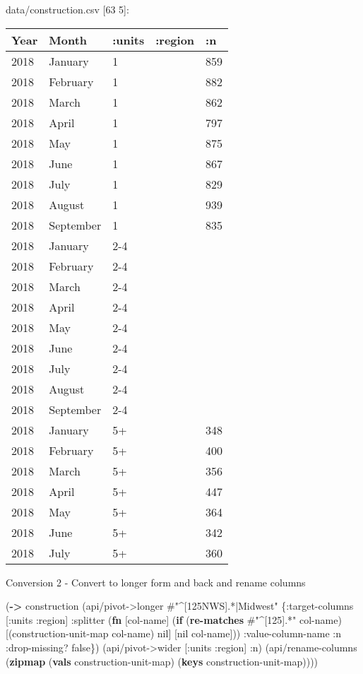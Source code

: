\documentclass[]{article}
\newenvironment{Shaded}{\begin{snugshade}}{\end{snugshade}}
\newcommand{\KeywordTok}[1]{\textcolor[rgb]{0.13,0.29,0.53}{\textbf{#1}}}
\newcommand{\SpecialStringTok}[1]{\textcolor[rgb]{0.31,0.60,0.02}{#1}}
\newcommand{\VariableTok}[1]{\textcolor[rgb]{0.00,0.00,0.00}{#1}}
\newcommand{\AttributeTok}[1]{\textcolor[rgb]{0.77,0.63,0.00}{#1}}
\newcommand{\NormalTok}[1]{#1}
\begin{document}
data/construction.csv {[}63 5{]}:

\begin{longtable}[]{@{}lllll@{}}
\toprule
Year & Month & :units & :region & :n\tabularnewline
\midrule
\endhead
2018 & January & 1 & & 859\tabularnewline
2018 & February & 1 & & 882\tabularnewline
2018 & March & 1 & & 862\tabularnewline
2018 & April & 1 & & 797\tabularnewline
2018 & May & 1 & & 875\tabularnewline
2018 & June & 1 & & 867\tabularnewline
2018 & July & 1 & & 829\tabularnewline
2018 & August & 1 & & 939\tabularnewline
2018 & September & 1 & & 835\tabularnewline
2018 & January & 2-4 & &\tabularnewline
2018 & February & 2-4 & &\tabularnewline
2018 & March & 2-4 & &\tabularnewline
2018 & April & 2-4 & &\tabularnewline
2018 & May & 2-4 & &\tabularnewline
2018 & June & 2-4 & &\tabularnewline
2018 & July & 2-4 & &\tabularnewline
2018 & August & 2-4 & &\tabularnewline
2018 & September & 2-4 & &\tabularnewline
2018 & January & 5+ & & 348\tabularnewline
2018 & February & 5+ & & 400\tabularnewline
2018 & March & 5+ & & 356\tabularnewline
2018 & April & 5+ & & 447\tabularnewline
2018 & May & 5+ & & 364\tabularnewline
2018 & June & 5+ & & 342\tabularnewline
2018 & July & 5+ & & 360\tabularnewline
\bottomrule
\end{longtable}

Conversion 2 - Convert to longer form and back and rename columns

\begin{Shaded}
\begin{Highlighting}[]
\NormalTok{(}\KeywordTok{->}\NormalTok{ construction}
\NormalTok{    (api/pivot->longer }\SpecialStringTok{#"^[125NWS].*|Midwest"}\NormalTok{ \{}\AttributeTok{:target-columns}\NormalTok{ [}\AttributeTok{:units} \AttributeTok{:region}\NormalTok{]}
                                               \AttributeTok{:splitter}\NormalTok{ (}\KeywordTok{fn}\NormalTok{ [col-name]}
\NormalTok{                                                           (}\KeywordTok{if}\NormalTok{ (}\KeywordTok{re-matches} \SpecialStringTok{#"^[125].*"}\NormalTok{ col-name)}
\NormalTok{                                                             [(construction-unit-map col-name) }\VariableTok{nil}\NormalTok{]}
\NormalTok{                                                             [}\VariableTok{nil}\NormalTok{ col-name]))}
                                               \AttributeTok{:value-column-name} \AttributeTok{:n}
                                               \AttributeTok{:drop-missing}\NormalTok{? }\VariableTok{false}\NormalTok{\})}
\NormalTok{    (api/pivot->wider [}\AttributeTok{:units} \AttributeTok{:region}\NormalTok{] }\AttributeTok{:n}\NormalTok{)}
\NormalTok{    (api/rename-columns (}\KeywordTok{zipmap}\NormalTok{ (}\KeywordTok{vals}\NormalTok{ construction-unit-map)}
\NormalTok{                                (}\KeywordTok{keys}\NormalTok{ construction-unit-map))))}
\end{Highlighting}
\end{Shaded}
\end{document}
